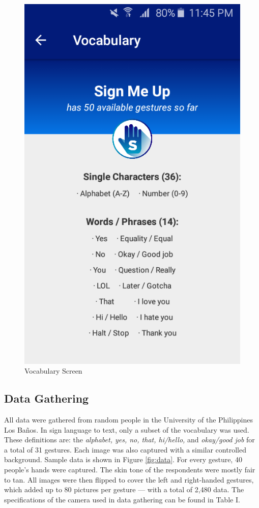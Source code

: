 \documentclass[journal]{./IEEE/IEEEtran}
\begin{document}
\begin{figure}[ht!]
    \centering
    \includegraphics[width=0.75\linewidth]{./images/screen_vocabulary.png}
    \caption{Vocabulary Screen}
    \label{fig:vocabulary}
\end{figure}

\subsection{Data Gathering}
All data were gathered from random people in the University of the Philippines Los Ba\~{n}os. In sign language to text, only a subset of the vocabulary was used. These definitions are: the \textit{alphabet, yes, no, that, hi/hello,} and \textit{okay/good job} for a total of 31 gestures. Each image was also captured with a similar controlled background. Sample data is shown in Figure \ref{fig:data}.
\newline
\indent For every gesture, 40 people's hands were captured. The skin tone of the respondents were mostly fair to tan. All images were then flipped to cover the left and right-handed gestures, which added up to 80 pictures per gesture --- with a total of 2,480 data.
\newline
\indent The specifications of the camera used in data gathering can be found in Table I.
\end{document}
